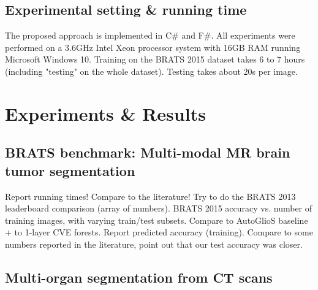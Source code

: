 \subsection{Experimental setting \& running time}

The proposed approach is implemented in C\# and F\#. All experiments were performed on a 3.6GHz Intel Xeon processor system with 16GB RAM running Microsoft Windows 10. Training on the BRATS 2015 dataset takes $6$ to $7$ hours (including "testing" on the whole dataset). Testing takes about $20$s per image.

\section{Experiments \& Results}
\label{sec: results}




\subsection{BRATS benchmark: Multi-modal MR brain tumor segmentation}

Report running times! Compare to the literature! Try to do the BRATS 2013 leaderboard comparison (array of numbers). BRATS 2015 accuracy vs. number of training images, with varying train/test subsets. Compare to AutoGlioS baseline + to 1-layer CVE forests. Report predicted accuracy (training). Compare to some numbers reported in the literature, point out that our test accuracy was closer.

\subsection{Multi-organ segmentation from CT scans}
